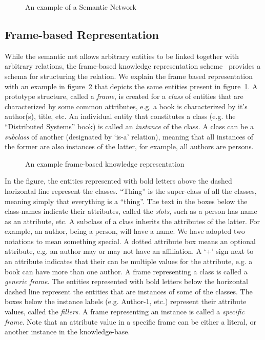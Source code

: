 \begin{figure}
	\centerline{
	}
	\caption{An example of a Semantic Network}
	\label{fig:dk:semanet}
\end{figure}

\subsection{Frame-based Representation}

While the semantic net allows arbitrary entities to be linked together with arbitrary relations, the frame-based knowledge 
representation scheme~\cite{MInsky:1974} provides a schema for structuring the relation. We explain the frame based 
representation with an example in figure~\ref{fig:dk:frame} that depicts the same entities present in figure~\ref{fig:dk:semanet}. 
%
A prototype structure, called a {\em frame}, is created for a {\em class} of entities that are characterized by some common 
attributes, e.g. a book is characterized by it's author(s), title, etc.  An individual entity that constitutes a class (e.g. 
the ``Distributed Systems'' book) is called an {\em instance} of the class. A class can be a {\em subclass} of another (designated
by `is-a' relation), meaning that all instances of the former are also instances of the latter, for example, all authors are persons.

\begin{figure}[htbp!]
	\centerline{
	}
	\caption{An example frame-based knowledge representation}
	\label{fig:dk:frame}
\end{figure}

 
 
In the figure, the entities represented with bold letters above the dashed horizontal line represent the classes. ``Thing''
is the super-class of all the classes, meaning simply that everything is a ``thing''. The text in the boxes below the class-names
indicate their attributes, called the {\em slots}, such as a person has name as an attribute, etc. A subclass of a class inherits 
the attributes of the latter. For example, an author, being a person, will have a name. We have adopted two notations to mean 
something special.
A dotted attribute box means an optional attribute, e.g. an author may or may not have an affiliation. A `+' sign next to
an attribute indicates that their can be multiple values for the attribute, e.g. a book can have more than one author.
A frame representing a class is called a {\em generic frame}.
%
The entities represented with bold letters below the horizontal dashed line represent the entities that are instances of some
of the classes. The boxes below the instance labels (e.g. Author-1, etc.) represent their attribute values, called the {\em
fillers}. A frame representing an instance is called a {\em specific frame}. Note that an attribute value in a specific frame
can be either a literal, or another instance in the knowledge-base. 


